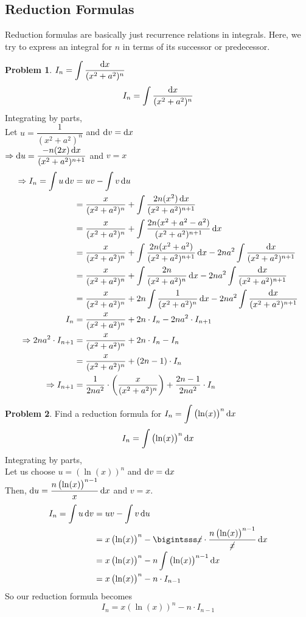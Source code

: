 \documentclass[14]{article}
\theoremstyle{definition}
\newtheorem{prob}{Problem}
\theoremstyle{case}
\begin{document}
\subsection{Reduction Formulas}
Reduction formulas are basically just recurrence relations in integrals. Here, we try to express an integral for $n$ in terms of its successor or predecessor.
\begin{prob}
$I_n = \displaystyle \int \dfrac{\dif x}{(x^2 + a^2)^n}$
\[I_n = \int \dfrac{\dif x}{(x^2 + a^2)^n}\]
Integrating by parts,\\
Let $u = \dfrac{1}{(x^2 + a^2)^n}$ and $\dif v = \dif x$\\
$\Rightarrow \dif u = \dfrac{-n(2x) \dif x}{(x^2 + a^2)^{n+1}}$ and $v = x$\\
\begin{align*}
\Rightarrow I_n = \int u \dif v &= uv - \int v \dif u\\
&= \dfrac{x}{(x^2 + a^2)^n} + \int \dfrac{2n(x^2) \dif x}{(x^2 + a^2)^{n+1}}\\
&= \dfrac{x}{(x^2 + a^2)^n} + \int \dfrac{2n(x^2 + a^2 - a^2)}{(x^2 + a^2)^{n+1}}\dif x\\
&= \dfrac{x}{(x^2 + a^2)^n} + \int \dfrac{2n(x^2 + a^2)}{(x^2 + a^2)^{n+1}}\dif x - 2na^2\int \dfrac{\dif x}{(x^2 + a^2)^{n+1}}\\
&= \dfrac{x}{(x^2 + a^2)^n} + \int \dfrac{2n}{(x^2 + a^2)^{n}}\dif x - 2na^2\int \dfrac{\dif x}{(x^2 + a^2)^{n+1}}\\
&= \dfrac{x}{(x^2 + a^2)^n} + 2n \int \dfrac{1}{(x^2 + a^2)^{n}}\dif x - 2na^2\int \dfrac{\dif x}{(x^2 + a^2)^{n+1}}\\
I_n&= \dfrac{x}{(x^2 + a^2)^n} + 2n \cdot I_n - 2na^2\cdot I_{n+1}\\
\Rightarrow 2na^2\cdot I_{n+1} &= \dfrac{x}{(x^2 + a^2)^n} + 2n \cdot I_n - I_n\\
&=\dfrac{x}{(x^2 + a^2)^n} + (2n-1) \cdot I_n\\
\Rightarrow I_{n+1} &= \dfrac1{2na^2} \cdot \left( \dfrac{x}{(x^2 + a^2)^n} \right)+\dfrac{2n-1}{2na^2}\cdot I_n
\end{align*}
\end{prob}
\pagebreak
\begin{prob}
Find a reduction formula for $I_n = \displaystyle \int \left( \ln(x) \right)^n \dif x$\\
\[I_n = \int \left( \ln(x) \right)^n \dif x\]
Integrating by parts,\\
Let us choose $u = \left(\ln(x)\right)^n$ and $\dif v = \dif x$\\
Then, $\dif u = \dfrac{n \left(\ln(x)\right)^{n-1}}{x} \dif x$ and $v = x$.
\begin{align*}
I_n = \int u \dif v &= uv - \int v \dif u\\
&= x \left( \ln(x) \right)^n - \bigintsss \cancel{x} \cdot \dfrac{n \left(\ln(x)\right)^{n-1}}{\cancel{x}} \dif x\\
&= x \left( \ln(x) \right)^n - n \int \left( \ln(x) \right)^{n-1} \dif x\\
&=  x \left( \ln(x) \right)^n - n \cdot I_{n-1}
\end{align*}
So our reduction formula becomes
\[I_n = x \left( \ln(x) \right)^n - n \cdot I_{n-1}\]
\end{prob}
\end{document}
